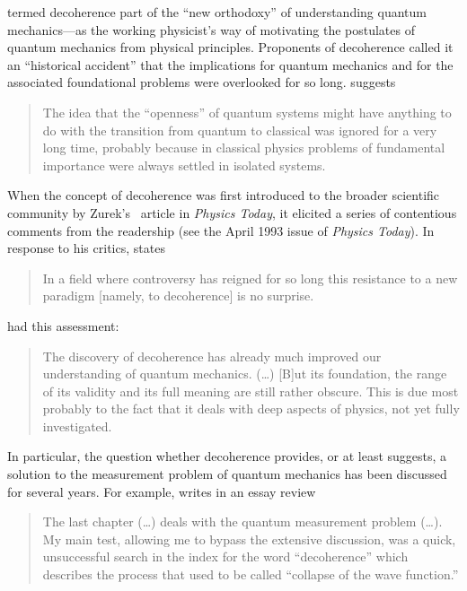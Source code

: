 \documentclass[twocolumn,rmp,aps,amsmath,amsfonts,noshowkeys,noshowpacs]{revtex4}
\begin{document}
\citet{Bub:1997:iq} termed decoherence part of the ``new orthodoxy''
of understanding quantum mechanics---as the working physicist's way of
motivating the postulates of quantum mechanics from physical
principles. Proponents of decoherence called it an ``historical
accident'' \citep[p.~13]{Joos:1999:po} that the implications for
quantum mechanics and for the associated foundational problems were
overlooked for so long.  \citet[][p.~717]{Zurek:2002:ii} suggests
%
\begin{quote}
  {\small The idea that the ``openness'' of quantum systems might have
  anything to do with the transition from quantum to classical was
  ignored for a very long time, probably because in classical physics
  problems of fundamental importance were always settled in isolated
  systems.}
\end{quote}
%
When the concept of decoherence was first introduced to the broader
scientific community by Zurek's~\citeyearpar{Zurek:1991:vv} article in
\emph{Physics Today}, it elicited a series of contentious comments
from the readership (see the April 1993 issue of \emph{Physics
  Today}). In response to his critics, \citet[p.~718]{Zurek:2002:ii}
states
%
\begin{quote} {\small 
    In a field where controversy has reigned for so long this
    resistance to a new paradigm [namely, to decoherence] is no
    surprise.}
\end{quote}
%
\citet[p.~2]{Omnes:2003:tt} had this assessment:
%
\begin{quote} {\small
    The discovery of decoherence has already much improved our
    understanding of quantum mechanics. (\dots) [B]ut its foundation,
    the range of its validity and its full meaning are still rather
    obscure. This is due most probably to the fact that it deals with
    deep aspects of physics, not yet fully investigated.}
\end{quote}
%
In particular, the question whether decoherence provides, or at least
suggests, a solution to the measurement problem of quantum mechanics
has been discussed for several years. For example,
\citet[p.~492]{Anderson:2001:rc} writes in an essay review
%
\begin{quote} {\small 
    The last chapter (\dots) deals with the quantum measurement
    problem (\dots).  My main test, allowing me to bypass the
    extensive discussion, was a quick, unsuccessful search in the
    index for the word ``decoherence'' which describes the process
    that used to be called ``collapse of the wave function.''}
\end{quote} 
\end{document}
